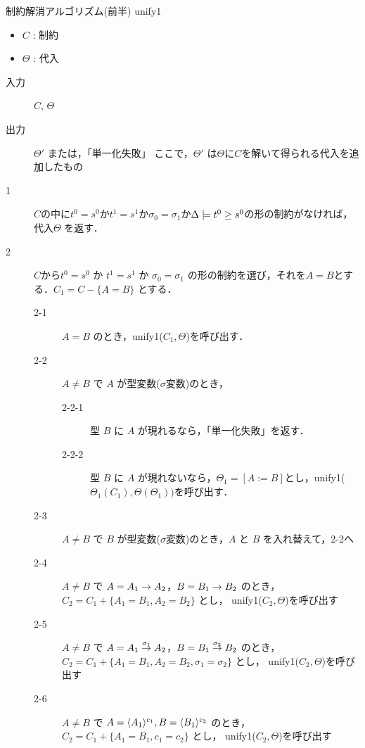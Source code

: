 \begin{oframed}
  制約解消アルゴリズム(前半) unify1
  \begin{itemize}
    \setlength{\itemsep}{-5pt}
  \item $C$ : 制約
  \item $\Theta$ : 代入
  \end{itemize}

  \begin{description}
  \item[入力] $C$, $\Theta$
  \item[出力] $\Theta'$ または，「単一化失敗」
    ここで，$\Theta'$ は$\Theta$に$C$を解いて得られる代入を追加したもの
  \end{description}

  \begin{description}           %
  \item[1] $C$の中に$t^0=s^0$か$t^1=s^1$か$\sigma_0 = \sigma_1$か$\Delta \models \longer{t^0}{s^0}$の形の制約がなければ，代入$\Theta$ を返す．
  \item[2] $C$から$t^0=s^0$ か $t^1=s^1$ か $\sigma_0 = \sigma_1$ の形の制約を選び，それを$A = B$とする．$C_1 = C - \{A = B\}$ とする．
    \begin{description}
    \item[2-1] $A = B$ のとき，unify1($C_1, \Theta$)を呼び出す．
    \item[2-2] $A \neq B$ で $A$ が型変数($\sigma$変数)のとき，
      \begin{description}
      \item[2-2-1] 型 $B$ に $A$ が現れるなら，「単一化失敗」を返す．
      \item[2-2-2] 型 $B$ に $A$ が現れないなら，$\Theta_1 = [A := B]$とし，unify1($\Theta_1(C_1), \Theta(\Theta_1))$を呼び出す．
      \end{description}
    \item[2-3] $A \neq B$ で $B$ が型変数($\sigma$変数)のとき，$A$ と $B$ を入れ替えて，2-2へ
    \item[2-4] $A \neq B$ で $A = \funT{A_1}{A_2}{}$，$B = \funT{B_1}{B_2}{}$ のとき， $C_2 = C_1 + \{A_1 = B_1, A_2 = B_2\}$ とし， unify1($C_2, \Theta$)を呼び出す
    \item[2-5] $A \neq B$ で $A = \funT{A_1}{A_2}{\sigma_1}$，$B = \funT{B_1}{B_2}{\sigma_2}$ のとき， $C_2 = C_1 + \{A_1 = B_1, A_2 = B_2, \sigma_1 = \sigma_2\}$ とし， unify1($C_2, \Theta$)を呼び出す
    \item[2-6] $A \neq B$ で $A = \codeT{A_1}{c_1} , B = \codeT{B_1}{c_2}$ のとき，$C_2 = C_1 + \{A_1 = B_1, c_1 = c_2\}$ とし， unify1($C_2, \Theta$)を呼び出す

\end{description}
\end{description}
\end{oframed}
